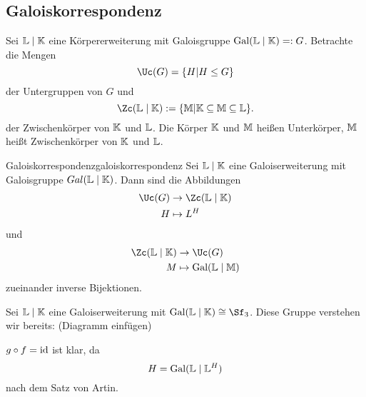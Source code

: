 \subsection{Galoiskorrespondenz}
\label{subsec:galoiskorrespondenz}

Sei $\mathbb{L} \mid \mathbb{K}$ eine Körpererweiterung mit Galoisgruppe $\operatorname{\text{Gal}}(\mathbb{L}\mid \mathbb{K}) =: G$. Betrachte die Mengen
\begin{equation}
\Uc(G) = \{H | H \leq G\}
\end{equation}
der Untergruppen von $G$ und
\begin{equation}
\Zc(\L \mid \K) := \{\M | \K \sub \M \sub \L\}.
\end{equation}
der Zwischenkörper von $\mathbb{K}$ und $\mathbb{L}$. Die Körper $\mathbb{K}$ und $\mathbb{M}$ heißen Unterkörper, $\mathbb{M}$ heißt Zwischenkörper von $\mathbb{K}$ und $\mathbb{L}$.
\begin{theorem}{Galoiskorrespondenz}{galoiskorrespondenz}
Sei $\mathbb{L} \mid \mathbb{K}$ eine Galoiserweiterung mit Galoisgruppe $Gal(\mathbb{L} \mid \mathbb{K})$. Dann sind die Abbildungen
\begin{equation}
\begin{split}
\Uc (G) &\to \Zc (\L \mid \K)\\
H &\mapsto L^H
\end{split}
\end{equation}
und
\begin{equation}
\begin{split}
\Zc (\L \mid \K) &\to \Uc (G)\\
M &\mapsto \Gal(\L \mid \M)
\end{split}
\end{equation}
zueinander inverse Bijektionen.
\end{theorem}
\begin{beispiel}
Sei $\mathbb{L} \mid \mathbb{K}$ eine Galoiserweiterung mit $\Gal(\L \mid \K) \cong \Sf_3$. Diese Gruppe verstehen wir bereits: (Diagramm einfügen)
\end{beispiel}
\begin{beweis}
$g \circ f = \text{id}$ ist klar, da
\begin{equation}
H = \operatorname{\text{Gal}}(\mathbb{L} \mid \mathbb{L}^H)
\end{equation}
nach dem Satz von Artin.
\end{beweis}

